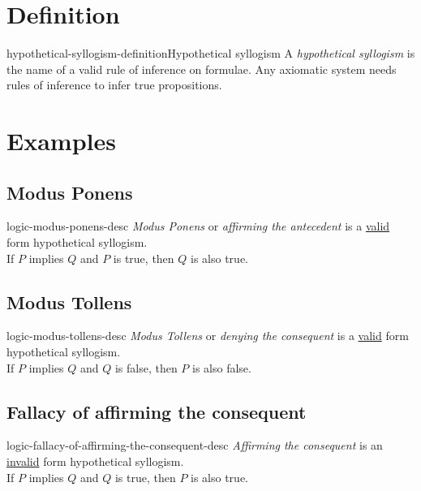 \documentclass[preview]{standalone}
\begin{document}
\genpage

\section{Definition}

\begin{snippetdefinition}{hypothetical-syllogism-definition}{Hypothetical syllogism}
    A \textit{hypothetical syllogism} is the name of a valid rule of inference on formulae.
    Any axiomatic system needs rules of inference to infer true propositions.
\end{snippetdefinition}


\section{Examples}

\subsection{Modus Ponens}

\begin{snippet}{logic-modus-ponens-desc}
\textit{Modus Ponens} or \textit{affirming the antecedent}
is a \underline{valid} form hypothetical syllogism. \\
If \(P\) implies \(Q\) and \(P\) is true, then \(Q\) is also true.
\end{snippet}


\subsection{Modus Tollens}

\begin{snippet}{logic-modus-tollens-desc}
\textit{Modus Tollens} or \textit{denying the consequent}
is a \underline{valid} form hypothetical syllogism. \\
If \(P\) implies \(Q\) and \(Q\) is false, then \(P\) is also false.
\end{snippet}


\subsection{Fallacy of affirming the consequent}

\begin{snippet}{logic-fallacy-of-affirming-the-consequent-desc}
\textit{Affirming the consequent}
is an \underline{invalid} form hypothetical syllogism. \\
If \(P\) implies \(Q\) and \(Q\) is true, then \(P\) is also true.
\end{snippet}
\end{document}
